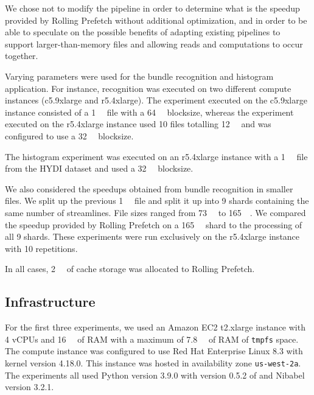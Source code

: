 We chose not to modify the pipeline in order to determine what is the speedup
provided by Rolling Prefetch without additional optimization, and in order to be
able to speculate on the possible benefits of adapting existing pipelines to
support larger-than-memory files and allowing reads and computations to occur
together.

Varying parameters were used for the bundle recognition and histogram
application. For instance, recognition was executed on two different compute
instances (c5.9xlarge and r5.4xlarge). The experiment executed on the c5.9xlarge
instance consisted of a \SI{1}{\gibi\byte} file with a \SI{64}{\mebi\byte}
blocksize, whereas the experiment executed on the r5.4xlarge instance used 10
files totalling \SI{12}{\gibi\byte} and was configured to use a
\SI{32}{\mebi\byte} blocksize. 

The histogram experiment was executed on an r5.4xlarge instance with a
\SI{1}{\gibi\byte} file from the HYDI dataset and used a \SI{32}{\mebi\byte}
blocksize.

We also considered the speedups obtained from bundle recognition in smaller
files. We split up the previous \SI{1}{\gibi\byte} file and split it up into 9
shards containing the same number of streamlines. File sizes ranged from
\SI{73}{\mebi\byte} to \SI{165}{\mebi\byte}. We compared the speedup provided by
Rolling Prefetch on a \SI{165}{\mebi\byte} shard to the processing of all 9
shards. These experiments were run exclusively on the r5.4xlarge instance with
10 repetitions.


In all cases, \SI{2}{\gibi\byte} of cache storage was allocated to Rolling
Prefetch.

\subsection{Infrastructure}

For the first three experiments, we used an Amazon EC2 t2.xlarge instance with 4
vCPUs and \SI{16}{\gibi\byte} of RAM with a maximum of \SI{7.8}{\gibi\byte} of
RAM of \texttt{tmpfs} space. The compute instance was configured to use Red Hat
Enterprise Linux 8.3 with kernel version 4.18.0. This instance was hosted in
availability zone \texttt{us-west-2a}. The experiments all used Python version
3.9.0 with version 0.5.2 of \sfs and Nibabel version 3.2.1.


